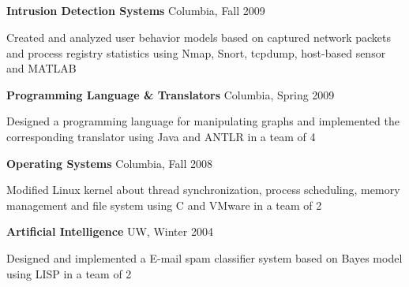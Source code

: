 \documentclass[margin,line]{resume}
\begin{document}
\begin{resume}
      

    \section{\mysidestyle [System]} 

    \textbf{Intrusion Detection Systems} \hfill Columbia, Fall 2009  \vspace{-3mm}\\\vspace{-1mm}%
      \begin{list2}
      \item Created and analyzed user behavior models based on captured network packets and process registry statistics using Nmap, Snort, tcpdump, host-based sensor and MATLAB 
      \end{list2}
      

    \textbf{Programming Language \& Translators} \hfill Columbia, Spring 2009  \vspace{-3mm}\\\vspace{-1mm}%
      \begin{list2}
      \item Designed a programming language for manipulating graphs and implemented the corresponding translator using Java and ANTLR in a team of 4 
      \end{list2}

    \textbf{Operating Systems} \hfill Columbia, Fall 2008  \vspace{-3mm}\\\vspace{-1mm}%
      \begin{list2}
      \item Modified Linux kernel about thread synchronization, process scheduling, memory management and file system using C and VMware in a team of 2 
      \end{list2}

      

    \textbf{Artificial Intelligence} \hfill UW, Winter 2004  \vspace{-3mm}\\\vspace{-1mm}%
      \begin{list2}
      \item Designed and implemented a E-mail spam classifier system based on Bayes model using LISP in a team of 2 
      \end{list2}


\end{resume}
\end{document}
